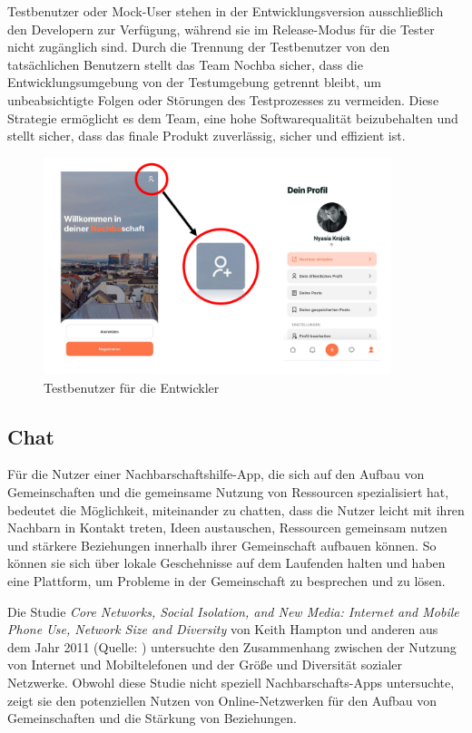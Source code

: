 Testbenutzer oder Mock-User stehen in der Entwicklungsversion ausschließlich den Developern zur Verfügung, während sie im Release-Modus für die Tester nicht zugänglich sind. Durch die Trennung der Testbenutzer von den tatsächlichen Benutzern stellt das Team Nochba sicher, dass die Entwicklungsumgebung von der Testumgebung getrennt bleibt, um unbeabsichtigte Folgen oder Störungen des Testprozesses zu vermeiden. Diese Strategie ermöglicht es dem Team, eine hohe Softwarequalität beizubehalten und stellt sicher, dass das finale Produkt zuverlässig, sicher und effizient ist.

\begin{figure}[H]
  \centering
  \includegraphics[width=0.9\textwidth]{pics/dummy-user-screenshots.png}
  \caption{Testbenutzer für die Entwickler}
  \label{fig:dummy-user-screenshots}
\end{figure}


\subsection{Chat}

Für die Nutzer einer Nachbarschaftshilfe-App, die sich auf den Aufbau von Gemeinschaften und die gemeinsame Nutzung von Ressourcen spezialisiert hat, bedeutet die Möglichkeit, miteinander zu chatten, dass die Nutzer leicht mit ihren Nachbarn in Kontakt treten, Ideen austauschen, Ressourcen gemeinsam nutzen und stärkere Beziehungen innerhalb ihrer Gemeinschaft aufbauen können. So können sie sich über lokale Geschehnisse auf dem Laufenden halten und haben eine Plattform, um Probleme in der Gemeinschaft zu besprechen und zu lösen.

Die Studie \textit{Core Networks, Social Isolation, and New Media: Internet and Mobile Phone Use, Network Size and Diversity} von Keith Hampton und anderen aus dem Jahr 2011 (Quelle: \cite{hampton-core} ) untersuchte den Zusammenhang zwischen der Nutzung von Internet und Mobiltelefonen und der Größe und Diversität sozialer Netzwerke. Obwohl diese Studie nicht speziell Nachbarschafts-Apps untersuchte, zeigt sie den potenziellen Nutzen von Online-Netzwerken für den Aufbau von Gemeinschaften und die Stärkung von Beziehungen.

